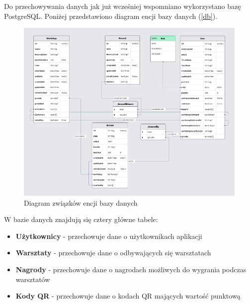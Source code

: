Do przechowywania danych jak już wcześniej wspomniano wykorzystano bazę PostgreSQL. Poniżej przedstawiono diagram encji bazy danych (\autoref{db}).
\begin{figure} [H]
    \begin{center}
    \includegraphics[scale=0.23]{imgs/database.png}
    \end{center}
    \caption{Diagram związków encji bazy danych}
    \label{db}
    \end{figure}
\noindent W bazie danych znajdują się cztery główne tabele:
\begin{itemize}
    \item \textbf{Użytkownicy} - przechowuje dane o użytkownikach aplikacji
    \item \textbf{Warsztaty} - przechowuje dane o  odbywających się warsztatach
    \item \textbf{Nagrody} - przechowuje dane o nagrodach możliwych do wygrania podczas warsztatów
    \item \textbf{Kody QR} - przechowuje dane o kodach QR mających wartość punktową
\end{itemize}

